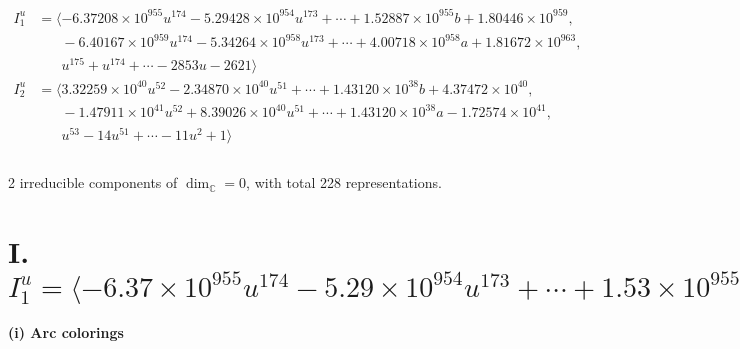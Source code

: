\documentclass[1p]{elsarticle_modified}
\theoremstyle{definition}
\begin{document}
\begin{align*}
I^u_{1}&=\langle 
-6.37208\times10^{955} u^{174}-5.29428\times10^{954} u^{173}+\cdots+1.52887\times10^{955} b+1.80446\times10^{959},\\
\phantom{I^u_{1}}&\phantom{= \langle  }-6.40167\times10^{959} u^{174}-5.34264\times10^{958} u^{173}+\cdots+4.00718\times10^{958} a+1.81672\times10^{963},\\
\phantom{I^u_{1}}&\phantom{= \langle  }u^{175}+u^{174}+\cdots-2853 u-2621\rangle \\
I^u_{2}&=\langle 
3.32259\times10^{40} u^{52}-2.34870\times10^{40} u^{51}+\cdots+1.43120\times10^{38} b+4.37472\times10^{40},\\
\phantom{I^u_{2}}&\phantom{= \langle  }-1.47911\times10^{41} u^{52}+8.39026\times10^{40} u^{51}+\cdots+1.43120\times10^{38} a-1.72574\times10^{41},\\
\phantom{I^u_{2}}&\phantom{= \langle  }u^{53}-14 u^{51}+\cdots-11 u^2+1\rangle \\
\\
\end{align*}
\raggedright * 2 irreducible components of $\dim_{\mathbb{C}}=0$, with total 228 representations.\\
\newpage
\renewcommand{\arraystretch}{1}
\centering \section*{I. $I^u_{1}= \langle -6.37\times10^{955} u^{174}-5.29\times10^{954} u^{173}+\cdots+1.53\times10^{955} b+1.80\times10^{959},\;-6.40\times10^{959} u^{174}-5.34\times10^{958} u^{173}+\cdots+4.01\times10^{958} a+1.82\times10^{963},\;u^{175}+u^{174}+\cdots-2853 u-2621 \rangle$}
\flushleft \textbf{(i) Arc colorings}\\
\end{document}
